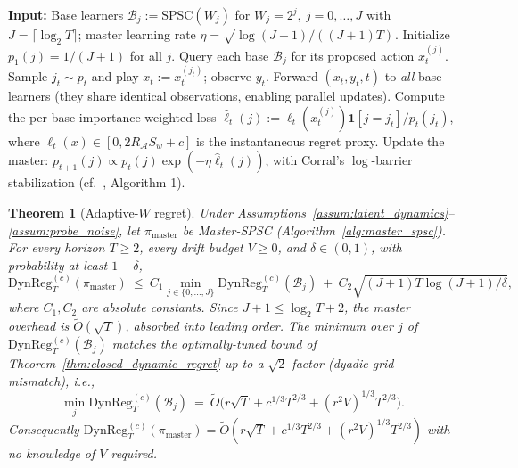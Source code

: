 \documentclass[11pt]{article}
\newcommand{\cA}{\mathcal{A}}
\newcommand{\DynReg}{\mathrm{DynReg}}
\newtheorem{theorem}{Theorem}
\begin{document}
\begin{algorithm}[t]
\caption{Master-SPSC (Window-Adaptive)}
\label{alg:master_spsc}
\begin{algorithmic}[1]
\State \textbf{Input:} Base learners $\mathcal B_j:=\text{SPSC}(W_j)$ for
       $W_j=2^j,\ j=0,\ldots,J$ with $J=\lceil\log_2 T\rceil$; master learning
       rate $\eta=\sqrt{\log(J+1)/((J+1)T)}$.
\State Initialize $p_1(j)=1/(J+1)$ for all $j$.
    \State Query each base $\mathcal B_j$ for its proposed action $x_t^{(j)}$.
    \State Sample $j_t\sim p_t$ and play $x_t:=x_t^{(j_t)}$; observe $y_t$.
    \State Forward $(x_t,y_t,t)$ to \emph{all} base learners (they share
           identical observations, enabling parallel updates).
    \State Compute the per-base importance-weighted loss
           $\hat\ell_t(j):=\ell_t(x_t^{(j)})\mathbf 1[j=j_t]/p_t(j_t)$, where
           $\ell_t(x)\in[0,2R_\cA S_w+c]$ is the instantaneous regret proxy.
    \State Update the master: $p_{t+1}(j)\propto p_t(j)\exp(-\eta\hat\ell_t(j))$,
           with Corral's $\log$-barrier stabilization (cf.\
           \citet{agarwal2017corralling}, Algorithm 1).
\EndFor
\end{algorithmic}
\end{algorithm}

\begin{theorem}[Adaptive-$W$ regret]
\label{thm:adaptive_W_regret}
Under Assumptions~\ref{assum:latent_dynamics}--\ref{assum:probe_noise}, let
$\pi_{\mathrm{master}}$ be Master-SPSC (Algorithm~\ref{alg:master_spsc}).  For
every horizon $T\ge 2$, every drift budget $V\ge 0$, and $\delta\in(0,1)$,
with probability at least $1-\delta$,
\begin{equation}
  \DynReg_T^{(c)}(\pi_{\mathrm{master}})\
  \le\ C_1\min_{j\in\{0,\ldots,J\}}\DynReg_T^{(c)}(\mathcal B_j)
  \ +\ C_2\sqrt{(J+1)T\log(J+1)/\delta},
  \label{eq:adaptive_W_rate}
\end{equation}
where $C_1,C_2$ are absolute constants.  Since $J+1\le\log_2 T+2$, the master
overhead is $\widetilde O(\sqrt T)$, absorbed into leading order.  The minimum
over $j$ of $\DynReg_T^{(c)}(\mathcal B_j)$ matches the optimally-tuned bound of
Theorem~\ref{thm:closed_dynamic_regret} up to a $\sqrt 2$ factor (dyadic-grid
mismatch), i.e.,
\begin{equation}
  \min_j\DynReg_T^{(c)}(\mathcal B_j)
  \ =\ \widetilde O\!\bigl(r\sqrt T+c^{1/3}T^{2/3}+(r^2V)^{1/3}T^{2/3}\bigr).
  \label{eq:min_j_rate}
\end{equation}
Consequently $\DynReg_T^{(c)}(\pi_{\mathrm{master}})=\widetilde O(r\sqrt T+c^{1/3}T^{2/3}+(r^2V)^{1/3}T^{2/3})$
with no knowledge of $V$ required.
\end{theorem}
\end{document}
